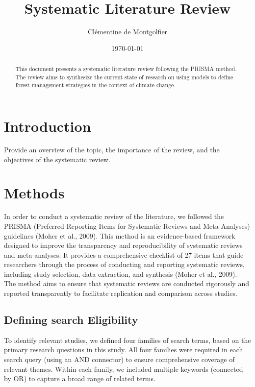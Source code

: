 \documentclass[a4paper,12pt]{article}
\title{Systematic Literature Review}
\author{Clémentine de Montgolfier}
\date{\today}
\begin{document}
\maketitle

\begin{abstract}
    This document presents a systematic literature review following the PRISMA method. The review aims to synthesize the current state of research on using models to define forest management strategies in the context of climate change.
\end{abstract}

\tableofcontents

\section{Introduction}
\label{sec:introduction}
Provide an overview of the topic, the importance of the review, and the objectives of the systematic review.

\section{Methods}
\label{sec:methods}

In order to conduct a systematic review of the literature, we followed the PRISMA (Preferred Reporting Items for Systematic Reviews and Meta-Analyses) guidelines (Moher et al., 2009).
This  method is an evidence-based framework designed to improve the transparency and reproducibility of systematic reviews and meta-analyses. It provides a comprehensive checklist of 27 items that guide researchers through the process of conducting and reporting systematic reviews, including study selection, data extraction, and synthesis (Moher et al., 2009). The method aims to ensure that systematic reviews are conducted rigorously and reported transparently to facilitate replication and comparison across studies.

\subsection{Defining search Eligibility}
\label{sec:search_eligibility}

To identify relevant studies, we defined four families of search terms, based on the primary research questions in this study. All four families were required in each search query (using an AND connector) to ensure comprehensive coverage of relevant themes. Within each family, we included multiple keywords (connected by OR) to capture a broad range of related terms. \\
\end{document}
